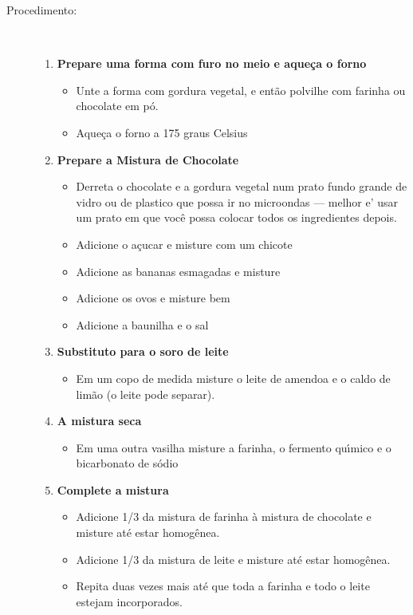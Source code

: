 \documentclass [11pt, letterpaper] {article}
\begin{document}
\begin{description}
\item[Procedimento:]\ \\
	\begin{enumerate}
	\item {\bf Prepare uma forma com furo no meio e aque\c{c}a o forno}
	\begin{itemize}
	\item Unte a forma com gordura vegetal, e ent\~ao polvilhe com farinha ou chocolate em p\'o. 
	\item Aque\c{c}a o forno a 175 graus Celsius
	 \end{itemize}
	\item {\bf Prepare a Mistura de Chocolate}
	\begin{itemize}
	\item Derreta o chocolate e a gordura vegetal num prato fundo grande de vidro ou de plastico que possa ir no microondas --- melhor e' usar um prato em que voc\^e possa colocar todos os ingredientes depois.
	 \item Adicione o a\c{c}ucar e misture com um chicote
	 \item Adicione as bananas esmagadas e misture 
	 \item Adicione os ovos e misture bem 
	 \item Adicione a baunilha e o sal
	\end{itemize}
	\item {\bf Substituto para o soro de leite}
	\begin{itemize}
        		\item Em um copo de medida misture o leite de amendoa e o caldo de lim\~ao (o leite pode separar). 
	\end{itemize}
	\item {\bf A mistura seca}
	\begin{itemize}
	\item Em uma outra vasilha misture a farinha, o fermento qu\'{\i}mico e o bicarbonato de s\'odio
       	\end{itemize}
	\item {\bf Complete a mistura}
	\begin{itemize}
        \item Adicione 1/3 da mistura de farinha \`a mistura de chocolate e misture at\'e estar homog\^enea.
        \item Adicione 1/3 da mistura de leite e misture at\'e estar homog\^enea. 
        \item Repita duas vezes mais at\'e que toda a farinha e todo o leite estejam incorporados.

\end{itemize}
\end{enumerate}
\end{description}
\end{document}
